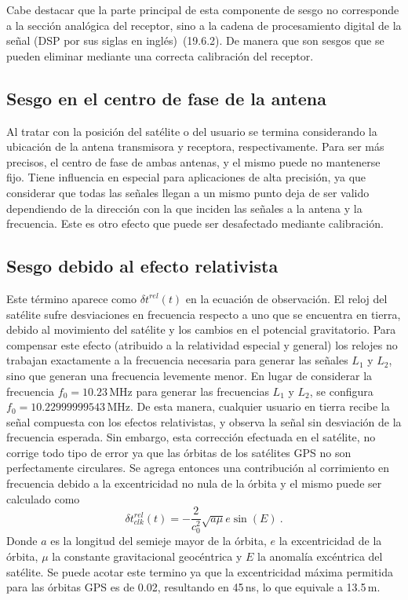 \documentclass[a4paper,12pt,oneside,onecolumn,final,openright]{book}%
\begin{document}
	 Cabe destacar que la parte principal de esta componente de sesgo no corresponde a la sección analógica del receptor, sino a la cadena de procesamiento digital de la señal (DSP por sus siglas en inglés)~\cite{handbook}(19.6.2). De manera que son sesgos que se pueden eliminar mediante una correcta calibración del receptor.
\subsection*{Sesgo en el centro de fase de la antena}
	Al tratar con la posición del satélite o del usuario se termina considerando la ubicación de la antena transmisora y receptora, respectivamente. Para ser más precisos, el centro de fase de ambas antenas, y el mismo puede no mantenerse fijo. Tiene influencia en especial para aplicaciones de alta precisión, ya que considerar que todas las señales llegan a un mismo punto deja de ser valido dependiendo de la dirección con la que inciden las señales a la antena y la frecuencia. Este es otro efecto que puede ser desafectado mediante calibración.
	 
\subsection*{Sesgo debido al efecto relativista}
	Este término aparece como $\delta t^{rel}(t)$ en la ecuación de observación. El reloj del satélite sufre desviaciones en frecuencia respecto a uno que se encuentra en tierra, debido al movimiento del satélite y los cambios en el potencial gravitatorio. Para compensar este efecto (atribuido a la relatividad especial y general) los relojes no trabajan exactamente a la frecuencia necesaria para generar las señales $L_1$ y $L_2$, sino que generan una frecuencia levemente menor. En lugar de considerar la frecuencia $f_0 = 10.23$\,MHz para generar las frecuencias $L_1$ y $L_2$, se configura $f_0 = 10.22999999543$\,MHz. De esta manera, cualquier usuario en tierra recibe la señal compuesta con los efectos relativistas, y observa la señal sin desviación de la frecuencia esperada. Sin embargo, esta corrección efectuada en el satélite, no corrige todo tipo de error ya que las órbitas de los satélites GPS no son perfectamente circulares. Se agrega entonces una contribución al corrimiento en frecuencia debido a la excentricidad no nula de la órbita y el mismo puede ser calculado como
\begin{equation}
	\delta t^{rel}_{clk}(t) = -\dfrac{2}{c_0^2}\sqrt{a\mu}e\sin(E) \ .
\end{equation}
	Donde $a$ es la longitud del semieje mayor de la órbita, $e$ la excentricidad de la órbita, $\mu$ la constante gravitacional geocéntrica y $E$ la anomalía excéntrica del satélite. Se puede acotar este termino ya que la excentricidad máxima permitida para las órbitas GPS es de 0.02, resultando en 45\,ns, lo que equivale a 13.5\,m.
	
\end{document}
